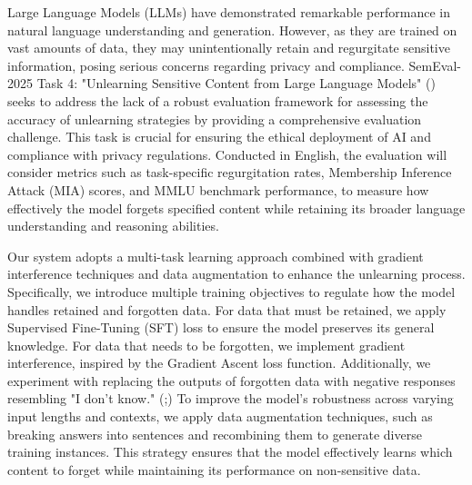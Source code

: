 \documentclass[11pt]{article}
\begin{document}
Large Language Models (LLMs) have demonstrated remarkable performance in natural language understanding and generation. However, as they are trained on vast amounts of data, they may unintentionally retain and regurgitate sensitive information, posing serious concerns regarding privacy and compliance. 
SemEval-2025 Task 4: "Unlearning Sensitive Content from Large Language Models"
(\citep{ramakrishna2025lumellmunlearningmultitask})
seeks to address the lack of a robust evaluation framework for assessing the accuracy of unlearning strategies by providing a comprehensive evaluation challenge. 
This task is crucial for ensuring the ethical deployment of AI and compliance with privacy regulations.
Conducted in English, the evaluation will consider metrics such as task-specific regurgitation rates, Membership Inference Attack (MIA) scores, and MMLU benchmark performance, to measure how effectively the model forgets specified content while retaining its broader language understanding and reasoning abilities.\par


Our system adopts a multi-task learning approach combined with gradient interference techniques and data augmentation to enhance the unlearning process. Specifically, we introduce multiple training objectives to regulate how the model handles retained and forgotten data. 
For data that must be retained, we apply Supervised Fine-Tuning (SFT) loss to ensure the model preserves its general knowledge. 
For data that needs to be forgotten, we implement gradient interference, inspired by the Gradient Ascent loss function. Additionally, we experiment with replacing the outputs of forgotten data with negative responses resembling  "I don’t know." (\citet{choi2024snap};\citet{shi2024ulmr}) 
To improve the model's robustness across varying input lengths and contexts, we apply data augmentation techniques, such as breaking answers into sentences and recombining them to generate diverse training instances. 
This strategy ensures that the model effectively learns which content to forget while maintaining its performance on non-sensitive data.
\end{document}
